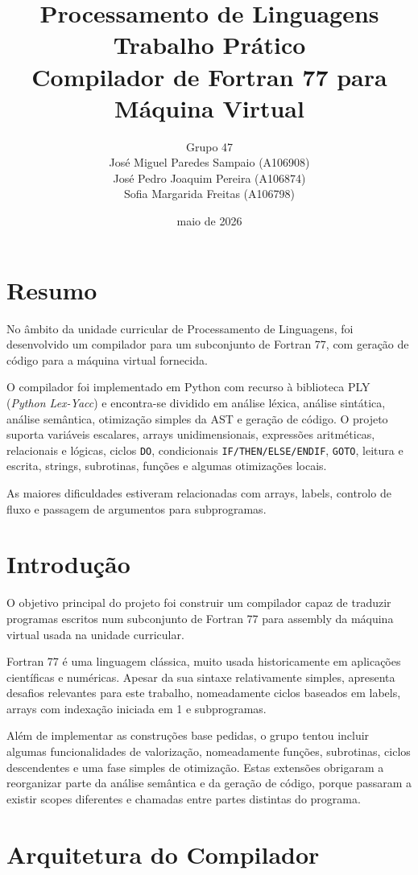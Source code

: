 \documentclass[11pt,a4paper]{article}
\title{
    Processamento de Linguagens \\
    \large Trabalho Prático \\
    \vspace{0.3cm}
    Compilador de Fortran 77 para Máquina Virtual
}
\author{
    Grupo 47 \\
    José Miguel Paredes Sampaio (A106908) \\
    José Pedro Joaquim Pereira (A106874) \\
    Sofia Margarida Freitas (A106798)
}
\date{maio de 2026}
\begin{document}
\maketitle
\tableofcontents
\newpage

\section{Resumo}

No âmbito da unidade curricular de Processamento de Linguagens, foi desenvolvido um compilador para um subconjunto de Fortran 77, com geração de código para a máquina virtual fornecida.

O compilador foi implementado em Python com recurso à biblioteca PLY (\textit{Python Lex-Yacc}) e encontra-se dividido em análise léxica, análise sintática, análise semântica, otimização simples da AST e geração de código. O projeto suporta variáveis escalares, arrays unidimensionais, expressões aritméticas, relacionais e lógicas, ciclos \texttt{DO}, condicionais \texttt{IF/THEN/ELSE/ENDIF}, \texttt{GOTO}, leitura e escrita, strings, subrotinas, funções e algumas otimizações locais.

As maiores dificuldades estiveram relacionadas com arrays, labels, controlo de fluxo e passagem de argumentos para subprogramas.

\section{Introdução}

O objetivo principal do projeto foi construir um compilador capaz de traduzir programas escritos num subconjunto de Fortran 77 para assembly da máquina virtual usada na unidade curricular.

Fortran 77 é uma linguagem clássica, muito usada historicamente em aplicações científicas e numéricas. Apesar da sua sintaxe relativamente simples, apresenta desafios relevantes para este trabalho, nomeadamente ciclos baseados em labels, arrays com indexação iniciada em 1 e subprogramas.

Além de implementar as construções base pedidas, o grupo tentou incluir algumas funcionalidades de valorização, nomeadamente funções, subrotinas, ciclos descendentes e uma fase simples de otimização. Estas extensões obrigaram a reorganizar parte da análise semântica e da geração de código, porque passaram a existir scopes diferentes e chamadas entre partes distintas do programa.

\section{Arquitetura do Compilador}
\end{document}
